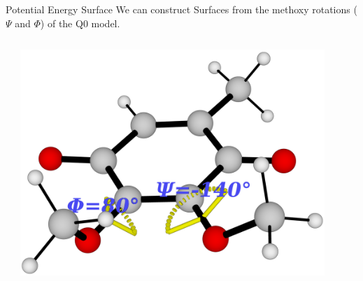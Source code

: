\documentclass[9pt,t,xcolor=table]{beamer}
\begin{document}
\begin{frame}{\huge Potential Energy Surface}\large
	We can construct Surfaces from the methoxy rotations ($\Psi$ and $\Phi$) of the Q0 model.
	\begin{columns}
		\begin{column}[c]{0.6\textwidth}
			\centering
			
			\vspace{10pt}
		\end{column}
		\begin{column}[c]{0.4\textwidth}
			\centering
			\includegraphics[width=0.9\textwidth]{Figs/dihedrals.png}
			\vspace{20pt}
		\end{column}
	\end{columns}
\end{frame}
\end{document}
